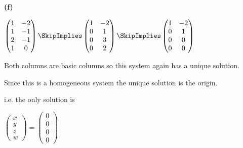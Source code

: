 \documentclass[oneside,12pt]{amsart}
\begin{document}
\bigskip

\textbf{(f)}

\bigskip

$
\begin{pmatrix}
1 & -2  \\
1 & -1  \\
2 & -1  \\
1 &  0
\end{pmatrix}
\SkipImplies
\begin{pmatrix}
1 & -2  \\
0 & 1   \\
0 & 3   \\
0 & 2
\end{pmatrix}
\SkipImplies
\begin{pmatrix}
1 & -2  \\
0 & 1   \\
0 & 0   \\
0 & 0
\end{pmatrix}
$


\bigskip

Both columns are basic columns so this system again has a unique solution.

Since this is a homogeneous system the unique solution is the origin.

i.e. the only solution is

$
\begin{pmatrix}
x \\ y \\ z \\ w
\end{pmatrix}
=
\begin{pmatrix}
0 \\ 0 \\ 0 \\ 0
\end{pmatrix}
$
\end{document}
